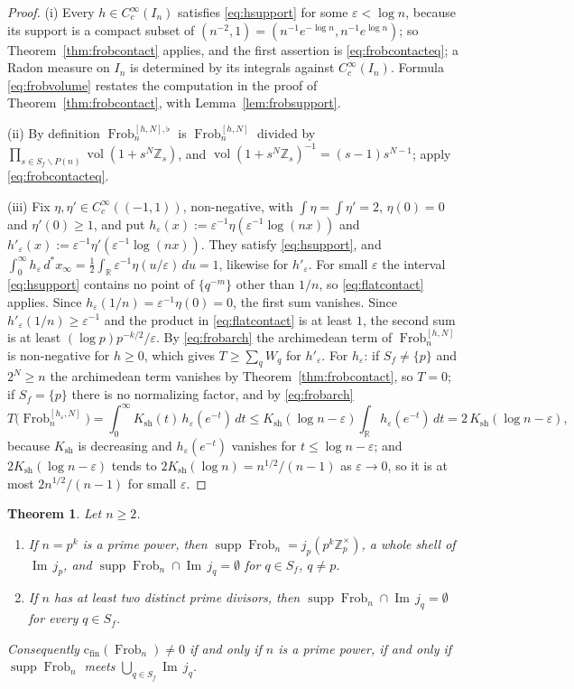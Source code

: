 \documentclass[11pt]{amsart}
\newtheorem{theorem}{Theorem}[section]
\theoremstyle{definition}
\newcommand{\R}{\mathbb R}
\newcommand{\Z}{\mathbb Z}
\newcommand{\Iml}{\operatorname{Im}}
\newcommand{\Frob}{\operatorname{Frob}}
\newcommand{\supp}{\operatorname{supp}}
\newcommand{\vol}{\operatorname{vol}}
\newcommand{\Ksh}{K_{\mathrm{sh}}}
\newcommand{\cfin}{\mathrm{c}_{\mathrm{fin}}}
\begin{document}
\begin{proof}
(i) Every $h\in C_c^\infty(I_n)$ satisfies \eqref{eq:hsupport} for some
$\varepsilon<\log n$, because its support is a compact subset of
$(n^{-2},1)=(n^{-1}e^{-\log n},n^{-1}e^{\log n})$; so
Theorem~\ref{thm:frobcontact} applies, and the first assertion is
\eqref{eq:frobcontacteq}; a Radon measure on $I_n$
is determined by its integrals against $C_c^\infty(I_n)$. Formula
\eqref{eq:frobvolume} restates the computation in the proof of
Theorem~\ref{thm:frobcontact}, with Lemma~\ref{lem:frobsupport}.

(ii) By definition $\Frob_n^{[h,N],\flat}$ is $\Frob_n^{[h,N]}$ divided by
$\prod_{s\in S_f\smallsetminus P(n)}\vol(1+s^N\Z_s)$, and
$\vol(1+s^N\Z_s)^{-1}=(s-1)s^{N-1}$; apply \eqref{eq:frobcontacteq}.

(iii) Fix $\eta,\eta'\in C_c^\infty((-1,1))$, non-negative, with
$\int\eta=\int\eta'=2$, $\eta(0)=0$ and $\eta'(0)\ge1$, and put
$h_\varepsilon(x):=\varepsilon^{-1}\eta(\varepsilon^{-1}\log(nx))$ and
$h'_\varepsilon(x):=\varepsilon^{-1}\eta'(\varepsilon^{-1}\log(nx))$. They
satisfy \eqref{eq:hsupport}, and
$\int_0^\infty h_\varepsilon\,d^*x_\infty
=\tfrac12\int_\R\varepsilon^{-1}\eta(u/\varepsilon)\,du=1$, likewise for
$h'_\varepsilon$. For small $\varepsilon$ the interval \eqref{eq:hsupport}
contains no point of $\{q^{-m}\}$ other than $1/n$, so \eqref{eq:flatcontact}
applies. Since $h_\varepsilon(1/n)=\varepsilon^{-1}\eta(0)=0$, the first sum
vanishes. Since $h'_\varepsilon(1/n)\ge\varepsilon^{-1}$ and the product in
\eqref{eq:flatcontact} is at least $1$, the second sum is at least
$(\log p)p^{-k/2}/\varepsilon$. By \eqref{eq:frobarch} the archimedean term
of $\Frob_n^{[h,N]}$ is non-negative for $h\ge0$, which gives
$T\ge\sum_qW_q$ for $h'_\varepsilon$. For $h_\varepsilon$: if
$S_f\ne\{p\}$ and $2^N\ge n$ the archimedean term vanishes by
Theorem~\ref{thm:frobcontact}, so $T=0$; if $S_f=\{p\}$ there is no
normalizing factor, and by \eqref{eq:frobarch}
\[
  T\bigl(\Frob_n^{[h_\varepsilon,N]}\bigr)
   =\int_0^\infty\Ksh(t)\,h_\varepsilon(e^{-t})\,dt
   \le\Ksh(\log n-\varepsilon)\int_\R h_\varepsilon(e^{-t})\,dt
   =2\,\Ksh(\log n-\varepsilon),
\]
because $\Ksh$ is decreasing and $h_\varepsilon(e^{-t})$ vanishes for
$t\le\log n-\varepsilon$; and $2\Ksh(\log n-\varepsilon)$ tends to
$2\Ksh(\log n)=n^{1/2}/(n-1)$ as $\varepsilon\to0$, so it is at most
$2n^{1/2}/(n-1)$ for small $\varepsilon$.
\end{proof}

\begin{theorem}\label{thm:compositedisjoint}
Let $n\ge2$.
\begin{enumerate}
\item[(i)] If $n=p^k$ is a prime power, then
$\supp\Frob_n=j_p(p^k\Z_p^\times)$, a whole shell of $\Iml\,j_p$, and
$\supp\Frob_n\cap\Iml\,j_q=\emptyset$ for $q\in S_f$, $q\ne p$.
\item[(ii)] If $n$ has at least two distinct prime divisors, then
$\supp\Frob_n\cap\Iml\,j_q=\emptyset$ for every $q\in S_f$.
\end{enumerate}
Consequently $\cfin(\Frob_n)\ne0$ if and only if $n$ is a prime power, if and
only if $\supp\Frob_n$ meets $\bigcup_{q\in S_f}\Iml\,j_q$.
\end{theorem}
\end{document}
